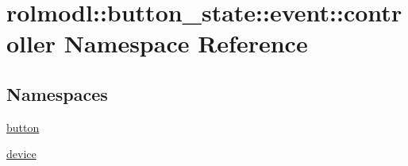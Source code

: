 \hypertarget{namespacerolmodl_1_1button__state_1_1event_1_1controller}{}\section{rolmodl\+::button\+\_\+state\+::event\+::controller Namespace Reference}
\label{namespacerolmodl_1_1button__state_1_1event_1_1controller}
\subsection*{Namespaces}
\begin{DoxyCompactItemize}
\item 
 \mbox{\hyperlink{namespacerolmodl_1_1button__state_1_1event_1_1controller_1_1button}{button}}
\item 
 \mbox{\hyperlink{namespacerolmodl_1_1button__state_1_1event_1_1controller_1_1device}{device}}
\end{DoxyCompactItemize}
